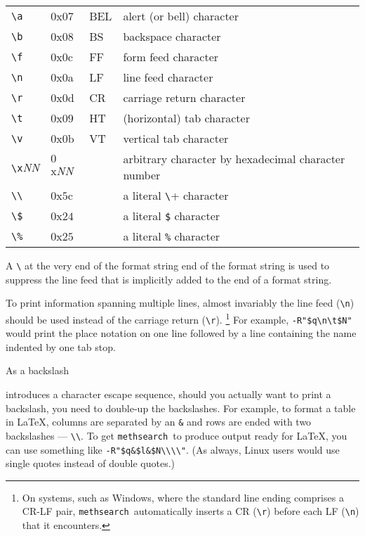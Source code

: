 \documentclass[a4paper,11pt,oneside]{book}
\makeatletter
\newcommand{\symidx}[2]{} %
\def\methsearch{\texttt{meth\-search}}
\makeatother
\begin{document}
\begin{tabular}{llll}
\verb+\a+& $0$x$07$& BEL& alert (or bell) character\\
\verb+\b+& $0$x$08$& BS&  backspace character\\
\verb+\f+& $0$x$0$c& FF&  form feed character\\
\verb+\n+& $0$x$0$a& LF&  line feed character\\
\verb+\r+& $0$x$0$d& CR&  carriage return character\\
\verb+\t+& $0$x$09$& HT&  (horizontal) tab character\\
\verb+\v+& $0$x$0$b& VT&  vertical tab character\\
\verb+\x+\textit{NN}  &$0$x\textit{NN}&
  &arbitrary character by hexadecimal character number\\
\verb+\\+& $0$x$5$c&   &  a literal \verb+\+ character\\
\verb+\$+& $0$x$24$&   &  a literal \verb+$+ character\\
\verb+\%+& $0$x$25$&   &  a literal \verb+%+ character\\
\end{tabular}

A \verb+\+ at the very end of the format string end of the format 
string is used to suppress the line feed that is implicitly
added to the end of a format string.

To print information spanning multiple lines, almost invariably the
line feed (\verb+\n+) should be used instead of the 
carriage return (\verb+\r+).%
\footnote{On systems, such as Windows, where the standard
line ending comprises a CR-LF pair,
\methsearch\ automatically inserts a CR (\verb+\r+) before each LF (\verb+\n+) 
that it encounters.}  For example, \verb+-R"$q\n\t$N"+ would print the 
place notation on one line followed by a line containing the name 
indented by one tab stop.

As a backslash%
\symidx{\textbackslash}{character escape sequence} 
introduces a character escape sequence, 
should you actually want to print a backslash, you need to double-up the 
backslashes.  For example, to format a table in \LaTeX{}, 
columns are separated by an \verb+&+ and rows are ended with two backslashes 
--- \verb+\\+.  
To get \methsearch\ to produce output ready for \LaTeX, you can use
something like \verb+-R"$q&$l&$N\\\\"+.  (As always, Linux users would use
single quotes instead of double quotes.)
\end{document}
